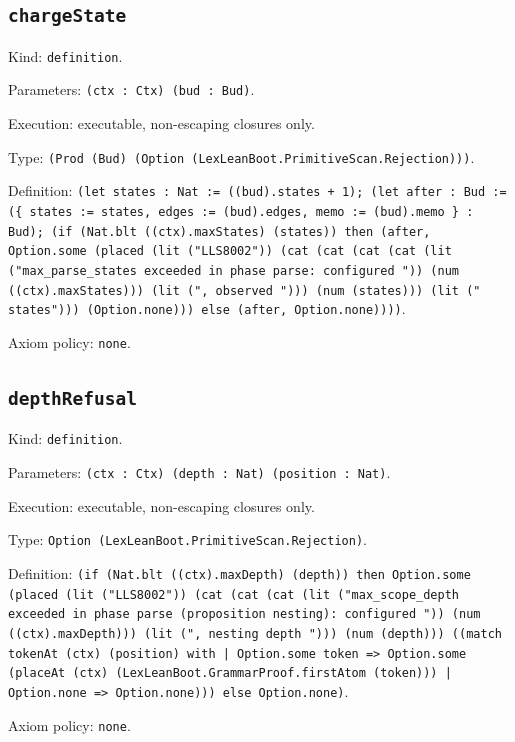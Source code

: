 \documentclass[11pt]{article}
\begin{document}
\subsection*{\texttt{chargeState}}
\noindent Kind: \texttt{definition}.\par
\noindent Parameters: \texttt{(ctx : Ctx) (bud : Bud)}.\par
\noindent Execution: executable, non-escaping closures only.\par
\noindent Type: \texttt{(Prod (Bud) (Option (LexLeanBoot.PrimitiveScan.Rejection)))}.\par
\noindent Definition: \texttt{(let states : Nat := ((bud).states + 1); (let after : Bud := (\{ states := states, edges := (bud).edges, memo := (bud).memo \} : Bud); (if (Nat.blt ((ctx).maxStates) (states)) then (after, Option.some (placed (lit ("LLS8002")) (cat (cat (cat (cat (lit ("max\_parse\_states exceeded in phase parse: configured ")) (num ((ctx).maxStates))) (lit (", observed "))) (num (states))) (lit (" states"))) (Option.none))) else (after, Option.none))))}.\par
\noindent Axiom policy: \texttt{none}.\par
\subsection*{\texttt{depthRefusal}}
\noindent Kind: \texttt{definition}.\par
\noindent Parameters: \texttt{(ctx : Ctx) (depth : Nat) (position : Nat)}.\par
\noindent Execution: executable, non-escaping closures only.\par
\noindent Type: \texttt{Option (LexLeanBoot.PrimitiveScan.Rejection)}.\par
\noindent Definition: \texttt{(if (Nat.blt ((ctx).maxDepth) (depth)) then Option.some (placed (lit ("LLS8002")) (cat (cat (cat (lit ("max\_scope\_depth exceeded in phase parse (proposition nesting): configured ")) (num ((ctx).maxDepth))) (lit (", nesting depth "))) (num (depth))) ((match tokenAt (ctx) (position) with | Option.some token => Option.some (placeAt (ctx) (LexLeanBoot.GrammarProof.firstAtom (token))) | Option.none => Option.none))) else Option.none)}.\par
\noindent Axiom policy: \texttt{none}.\par
\end{document}

